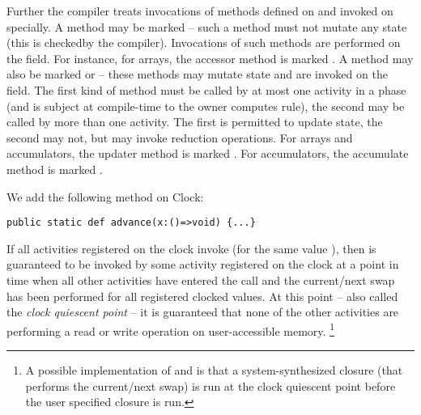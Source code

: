 Further the compiler treats invocations of methods defined on 
and invoked on  specially. A method may be marked
 -- such a method must not mutate any state (this is
checkedby the compiler). Invocations of such methods are performed on
the  field. For instance, for arrays, the accessor
method is marked .  A method may also be marked
 or  -- these methods may mutate state and
are invoked on the  field. The
first kind of method must be called by at most one activity in a phase
(and is subject at compile-time to the owner computes rule), the
second may be called by more than one activity. The first is permitted
to update state, the second may not, but may invoke reduction
operations. For arrays and accumulators, the updater method is marked
. For accumulators, the accumulate method is marked
.



We add the following method on Clock:
\begin{lstlisting}
public static def advance(x:()=>void) {...}
\end{lstlisting}

If all activities registered on the clock invoke 
(for the same value ), then  is guaranteed to be
invoked by some activity  registered on the clock at a point in time
when all other activities have entered the  call
and the current/next swap has been performed for all registered
clocked values.  At this point -- also called the {\em clock quiescent
point} -- it is guaranteed that none of the other activities are
performing a read or write operation on user-accessible memory.
\footnote{
A possible implementation of  and
 is that a system-synthesized closure (that
performs the current/next swap) is run at the clock quiescent point
before the user specified closure is run.}
